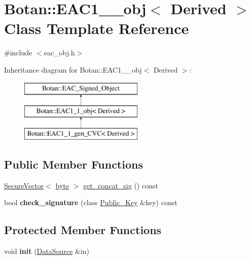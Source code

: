 \hypertarget{classBotan_1_1EAC1__1__obj}{\section{Botan\-:\-:E\-A\-C1\-\_\-\_\-obj$<$ Derived $>$ Class Template Reference}
\label{classBotan_1_1EAC1__1__obj}
}


{\ttfamily \#include $<$eac\-\_\-obj.\-h$>$}

Inheritance diagram for Botan\-:\-:E\-A\-C1\-\_\-\_\-obj$<$ Derived $>$\-:\begin{figure}[H]
\begin{center}
\leavevmode
\includegraphics[height=3.000000cm]{classBotan_1_1EAC1__1__obj}
\end{center}
\end{figure}
\subsection*{Public Member Functions}
\begin{DoxyCompactItemize}
\item 
\hyperlink{classBotan_1_1SecureVector}{Secure\-Vector}$<$ \hyperlink{namespaceBotan_a7d793989d801281df48c6b19616b8b84}{byte} $>$ \hyperlink{classBotan_1_1EAC1__1__obj_a347597a2f94777b4694d03fb17d98862}{get\-\_\-concat\-\_\-sig} () const 
\item 
\hypertarget{classBotan_1_1EAC1__1__obj_a733d3480d20927123db262bbae476d46}{bool {\bfseries check\-\_\-signature} (class \hyperlink{classBotan_1_1Public__Key}{Public\-\_\-\-Key} \&key) const }\label{classBotan_1_1EAC1__1__obj_a733d3480d20927123db262bbae476d46}

\end{DoxyCompactItemize}
\subsection*{Protected Member Functions}
\begin{DoxyCompactItemize}
\item 
\hypertarget{classBotan_1_1EAC1__1__obj_a8293b4de9911d699043a58cffc0b4a5f}{void {\bfseries init} (\hyperlink{classBotan_1_1DataSource}{Data\-Source} \&in)}\label{classBotan_1_1EAC1__1__obj_a8293b4de9911d699043a58cffc0b4a5f}

\end{DoxyCompactItemize}
